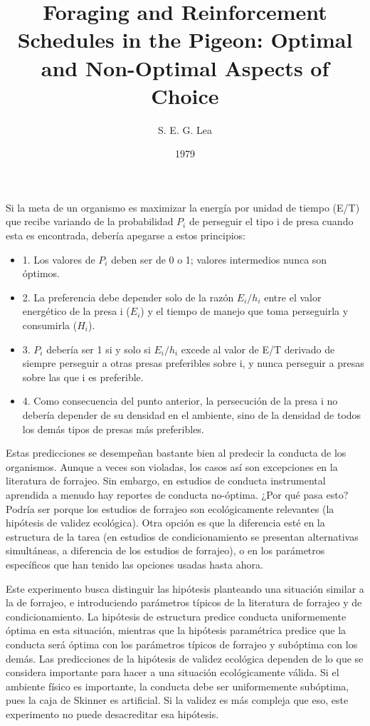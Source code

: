 \documentclass[a4paper,12pt]{article}
\title{Foraging and Reinforcement Schedules in the Pigeon: Optimal and Non-Optimal Aspects of Choice}
\author{S. E. G. Lea}
\date{1979}
\begin{document}
{\scshape\bfseries \maketitle}

Si la meta de un organismo es maximizar la energía por unidad de tiempo (E/T) que recibe variando de la probabilidad $P_i$ de perseguir el tipo i de presa cuando esta es encontrada, debería apegarse a estos principios:

\begin{itemize}
	\item 1. Los valores de $P_i$ deben ser de 0 o 1; valores intermedios nunca son óptimos.
	\item 2. La preferencia debe depender solo de la razón $E_i/h_i$ entre el valor energético de la presa i ($E_i$) y el tiempo de manejo que toma perseguirla y consumirla ($H_i$).
	\item 3. $P_i$ debería ser 1 si y solo si $E_i/h_i$ excede al valor de E/T derivado de siempre perseguir a otras presas preferibles sobre i, y nunca perseguir a presas sobre las que i es preferible.
	\item 4. Como consecuencia del punto anterior, la persecución de la presa i no debería depender de su densidad en el ambiente, sino de la densidad de todos los demás tipos de presas más preferibles.
\end{itemize}

Estas predicciones se desempeñan bastante bien al predecir la conducta de los organismos. Aunque a veces son violadas, los casos así son excepciones en la literatura de forrajeo. Sin embargo, en estudios de conducta instrumental aprendida a menudo hay reportes de conducta no-óptima. ¿Por qué pasa esto? Podría ser porque los estudios de forrajeo son ecológicamente relevantes (la hipótesis de validez ecológica). Otra opción es que la diferencia esté en la estructura de la tarea (en estudios de condicionamiento se presentan alternativas simultáneas, a diferencia de los estudios de forrajeo), o en los parámetros específicos que han tenido las opciones usadas hasta ahora.

Este experimento busca distinguir las hipótesis planteando una situación similar a la de forrajeo, e introduciendo parámetros típicos de la literatura de forrajeo y de condicionamiento. La hipótesis de estructura predice conducta uniformemente óptima en esta situación, mientras que la hipótesis paramétrica predice que la conducta será óptima con los parámetros típicos de forrajeo y subóptima con los demás. Las predicciones de la hipótesis de validez ecológica dependen de lo que se considera importante para hacer a una situación ecológicamente válida. Si el ambiente físico es importante, la conducta debe ser uniformemente subóptima, pues la caja de Skinner es artificial. Si la validez es más compleja que eso, este experimento no puede desacreditar esa hipótesis.
\end{document}
